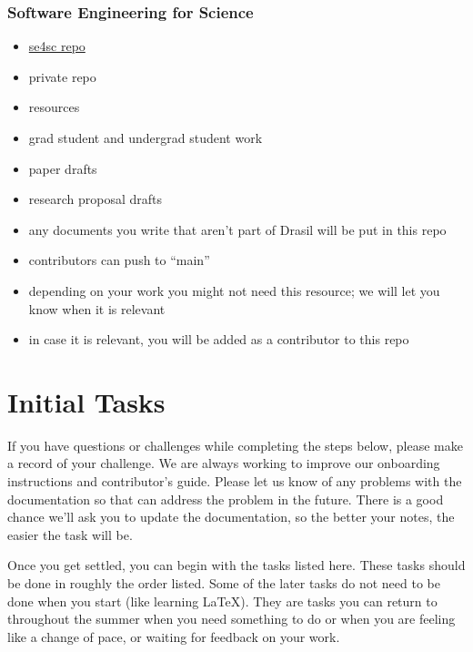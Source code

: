 \documentclass[12pt]{article}
\begin{document}
\subsubsection{Software Engineering for Science}
\begin{itemize}
\item \href{https://gitlab.cas.mcmaster.ca/SEforSC/se4sc} {se4sc repo}
\item private repo
\item resources
\item grad student and undergrad student work
\item paper drafts
\item research proposal drafts
\item any documents you write that aren't part of Drasil will be put in this repo
\item contributors can push to ``main''
\item depending on your work you might not need this resource; we will let you
know when it is relevant
\item in case it is relevant, you will be added as a contributor to this repo
\end{itemize}

\section{Initial Tasks} \label{SecInitialTasks}

If you have questions or challenges while completing the steps below, please
make a record of your challenge.  We are always working to improve our
onboarding instructions and contributor's guide.  Please let us know of any
problems with the documentation so that can address the problem in the future.
There is a good chance we'll ask you to update the documentation, so the better
your notes, the easier the task will be.

Once you get settled, you can begin with the tasks listed here.  These tasks
should be done in roughly the order listed.  Some of the later tasks do not need
to be done when you start (like learning LaTeX).  They are tasks you can return
to throughout the summer when you need something to do or when you are feeling
like a change of pace, or waiting for feedback on your work.
\end{document}
